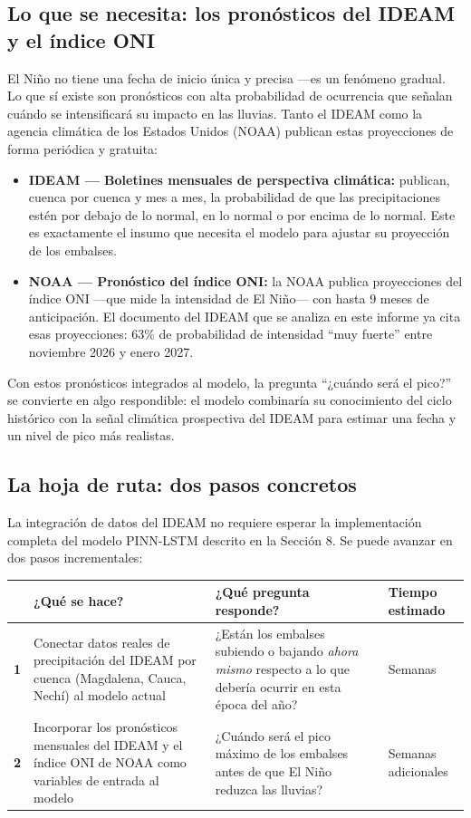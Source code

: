 \documentclass[11pt,a4paper]{article}
\begin{document}
\subsection{Lo que se necesita: los pronósticos del IDEAM y el índice ONI}

El Niño no tiene una fecha de inicio única y precisa —es un fenómeno gradual. Lo que sí existe son pronósticos con alta probabilidad de ocurrencia que señalan cuándo se intensificará su impacto en las lluvias. Tanto el IDEAM como la agencia climática de los Estados Unidos (NOAA) publican estas proyecciones de forma periódica y gratuita:

\begin{itemize}[leftmargin=*,itemsep=3pt]
\item \textbf{IDEAM --- Boletines mensuales de perspectiva climática:} publican, cuenca por cuenca y mes a mes, la probabilidad de que las precipitaciones estén por debajo de lo normal, en lo normal o por encima de lo normal. Este es exactamente el insumo que necesita el modelo para ajustar su proyección de los embalses.
\item \textbf{NOAA --- Pronóstico del índice ONI:} la NOAA publica proyecciones del índice ONI —que mide la intensidad de El Niño— con hasta 9 meses de anticipación. El documento del IDEAM que se analiza en este informe ya cita esas proyecciones: 63\% de probabilidad de intensidad ``muy fuerte'' entre noviembre 2026 y enero 2027.
\end{itemize}

Con estos pronósticos integrados al modelo, la pregunta ``¿cuándo será el pico?'' se convierte en algo respondible: el modelo combinaría su conocimiento del ciclo histórico con la señal climática prospectiva del IDEAM para estimar una fecha y un nivel de pico más realistas.

\subsection{La hoja de ruta: dos pasos concretos}

La integración de datos del IDEAM no requiere esperar la implementación completa del modelo PINN-LSTM descrito en la Sección 8. Se puede avanzar en dos pasos incrementales:

\begin{center}
\small
\begin{tabular}{@{}p{0.5cm}p{4.5cm}p{4.5cm}p{3.5cm}@{}}
\toprule
 & \textbf{¿Qué se hace?} & \textbf{¿Qué pregunta responde?} & \textbf{Tiempo estimado} \\
\midrule
\textbf{1} &
Conectar datos reales de precipitación del IDEAM por cuenca (Magdalena, Cauca, Nechí) al modelo actual &
¿Están los embalses subiendo o bajando \textit{ahora mismo} respecto a lo que debería ocurrir en esta época del año? &
Semanas \\
\addlinespace
\textbf{2} &
Incorporar los pronósticos mensuales del IDEAM y el índice ONI de NOAA como variables de entrada al modelo &
¿Cuándo será el pico máximo de los embalses antes de que El Niño reduzca las lluvias? &
Semanas adicionales \\
\bottomrule
\end{tabular}
\end{center}
\end{document}
